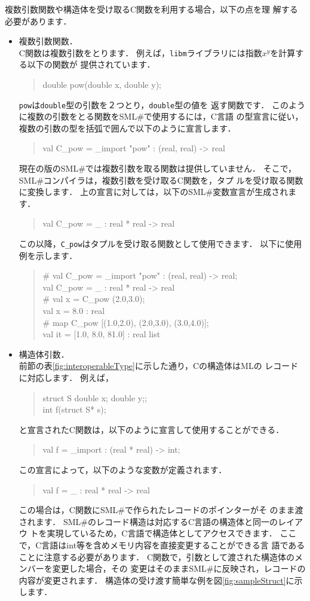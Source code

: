 \documentclass{jbook}
\newcommand{\smlsharp}{SML\#}
\newenvironment{program}{\begin{tt}\begin{quote}}{\end{quote}\end{tt}}
\begin{document}
	複数引数関数や構造体を受け取るC関数を利用する場合，以下の点を理
解する必要があります．
\begin{itemize}
\item 複数引数関数．\\
	C関数は複数引数をとります．
	例えば，{\tt libm}ライブラリには指数$x^y$を計算する以下の関数が
提供されています．
\begin{program}
double pow(double x, double y);
\end{program}
	{\tt pow}は{\tt double}型の引数を２つとり，{\tt double}型の値を
返す関数です．
	このように複数の引数をとる関数を\smlsharp{}で使用するには，C言語
の型宣言に従い，複数の引数の型を括弧で囲んで以下のように宣言します．
\begin{program}
val C\_pow = \_import "pow" : (real, real) -> real
\end{program}
	現在の版の\smlsharp{}では複数引数を取る関数は提供していません．
	そこで，\smlsharp{}コンパイラは，複数引数を受け取るC関数を，タプ
ルを受け取る関数に変換します．
	上の宣言に対しては，以下の\smlsharp{}変数宣言が生成されます．
\begin{program}
val C\_pow = \_ : real * real -> real\\
\end{program}
	この以降，{\tt C\_pow}はタプルを受け取る関数として使用できます．
	以下に使用例を示します．
\begin{program}
\# val C\_pow = \_import "pow" : (real, real) -> real;\\
val C\_pow = \_ : real * real -> real\\
\# val x = C\_pow (2.0,3.0);\\
val x = 8.0 : real\\
\# map C\_pow [(1.0,2.0), (2.0,3.0), (3.0,4.0)];\\
val it = [1.0, 8.0, 81.0] : real list
\end{program}

\item 構造体引数．\\
	前節の表\ref{fig:interoperableType}に示した通り，Cの構造体はMLの
レコードに対応します．
	例えば，
\begin{program}
struct S {double x; double y;};\\
 int f(struct S* s);
\end{program}
と宣言されたC関数は，以下のように宣言して使用することができる．
\begin{program}
val f =  \_import : (real * real) -> int;
\end{program}
	この宣言によって，以下のような変数が定義されます．
\begin{program}
val f = \_ : real * real -> real
\end{program}
	この場合は，C関数に\smlsharp{}で作られたレコードのポインターがそ
のまま渡されます．
	\smlsharp{}のレコード構造は対応するC言語の構造体と同一のレイアウ
トを実現しているため，C言語で構造体としてアクセスできます．
	ここで，C言語はint等を含めメモリ内容を直接変更することができる言
語であることに注意する必要があります．
	C関数で，引数として渡された構造体のメンバーを変更した場合，その
変更はそのまま\smlsharp{}に反映され，レコードの内容が変更されます．
	構造体の受け渡す簡単な例を図\ref{fig:sampleStruct}に示します．


\end{itemize}
\end{document}
